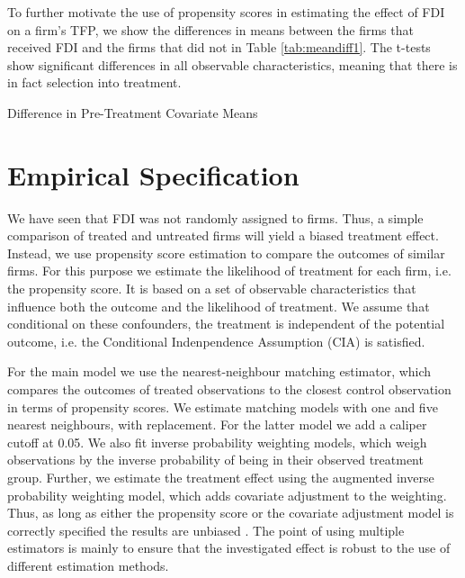 \documentclass[a4paper,11pt]{scrartcl}
\begin{document}
To further motivate the use of propensity scores in estimating the effect of FDI on a firm's TFP, we show the differences in means between the firms that received FDI and the firms that did not in Table \ref{tab:meandiff1}. The t-tests show significant differences in all observable characteristics, meaning that there is in fact selection into treatment. %


\begin{table}[h!]
	\centering
	\caption{Difference in Pre-Treatment Covariate Means}
	\makebox[\textwidth]{
	}
	\label{tab:meandiff1}
\end{table}

\newpage
\section{Empirical Specification}

We have seen that FDI was not randomly assigned to firms. Thus, a simple comparison of treated and untreated firms will yield a biased treatment effect. Instead, we use propensity score estimation to compare the outcomes of similar firms. For this purpose we estimate the  likelihood of treatment for each firm, i.e. the propensity score. It is based on a set of observable characteristics that influence both the outcome and the likelihood of treatment. We assume that conditional on these confounders, the treatment is independent of the potential outcome, i.e. the Conditional Indenpendence Assumption (CIA) is satisfied. 

For the main model we use the nearest-neighbour matching estimator, which compares the outcomes of treated observations to the closest control observation in terms of propensity scores. We estimate matching models  with one and five nearest neighbours, with replacement. For the latter model we add a caliper cutoff at 0.05. We also fit inverse probability weighting models, which weigh observations by the inverse probability of being in their observed treatment group. Further, we estimate the treatment effect using the augmented inverse probability weighting model, which adds covariate adjustment to the weighting. Thus, as long as either the propensity score or the covariate adjustment model is correctly specified the results are unbiased \citep[p.~393]{imbens2015}. The point of using multiple estimators is mainly to ensure that the investigated effect is robust to the use of different estimation methods.  
\end{document}
